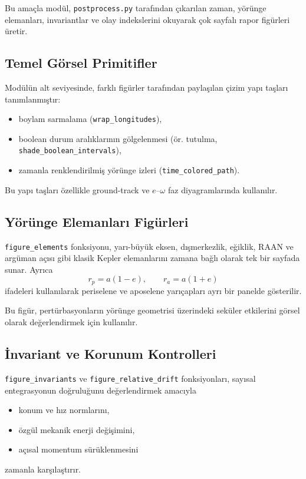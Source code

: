 Bu amaçla modül, \texttt{postprocess.py} tarafından çıkarılan
zaman, yörünge elemanları, invariantlar ve olay indekslerini
okuyarak çok sayfalı rapor figürleri üretir.

\subsection*{Temel Görsel Primitifler}
Modülün alt seviyesinde, farklı figürler tarafından paylaşılan
çizim yapı taşları tanımlanmıştır:
\begin{itemize}
  \item boylam sarmalama (\texttt{wrap\_longitudes}),
  \item boolean durum aralıklarının gölgelenmesi
        (ör. tutulma, \texttt{shade\_boolean\_intervals}),
  \item zamanla renklendirilmiş yörünge izleri
        (\texttt{time\_colored\_path}).
\end{itemize}

Bu yapı taşları özellikle ground-track ve
$e$--$\omega$ faz diyagramlarında kullanılır.

\subsection*{Yörünge Elemanları Figürleri}
\texttt{figure\_elements} fonksiyonu,
yarı-büyük eksen, dışmerkezlik, eğiklik, RAAN ve argüman açısı gibi
klasik Kepler elemanlarını zamana bağlı olarak tek bir sayfada sunar.
Ayrıca
\begin{equation}
r_p = a(1-e), \qquad r_a = a(1+e)
\end{equation}
ifadeleri kullanılarak periselene ve aposelene yarıçapları
ayrı bir panelde gösterilir.

Bu figür, pertürbasyonların yörünge geometrisi üzerindeki
seküler etkilerini görsel olarak değerlendirmek için kullanılır.

\subsection*{İnvariant ve Korunum Kontrolleri}
\texttt{figure\_invariants} ve
\texttt{figure\_relative\_drift} fonksiyonları,
sayısal entegrasyonun doğruluğunu değerlendirmek amacıyla
\begin{itemize}
  \item konum ve hız normlarını,
  \item özgül mekanik enerji değişimini,
  \item açısal momentum sürüklenmesini
\end{itemize}
zamanla karşılaştırır.

